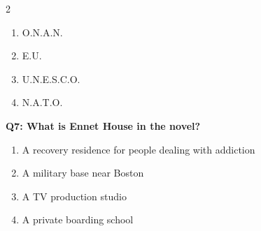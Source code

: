 \documentclass[10pt]{article}
\begin{document}
\begin{multicols}{2}
\begin{enumerate}[label=\arabic*.]
\item O.N.A.N.
\item E.U.
\item U.N.E.S.C.O.
\item N.A.T.O.
\end{enumerate}
\textbf{Q7: What is Ennet House in the novel?}

\begin{enumerate}[label=\arabic*.]
\item A recovery residence for people dealing with addiction
\item A military base near Boston
\item A TV production studio
\item A private boarding school
\end{enumerate}
\end{multicols}

\newpage
\end{document}

